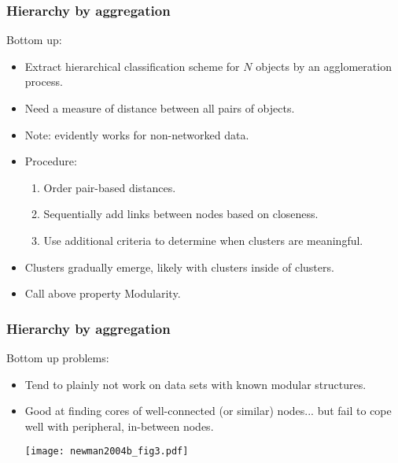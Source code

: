 \begin{frame}
  \frametitle{Hierarchy by aggregation}

  \begin{block}{Bottom up:}
    \begin{itemize}
    \item<1-> 
       Extract hierarchical
      classification scheme for $N$ objects by an agglomeration process.
    \item<2-> 
      Need a measure of distance between all pairs of objects.
    \item<3->
      Note: evidently works for non-networked data.
    \item<4->
      \alert{Procedure:}
      \begin{enumerate}
      \item<4-> 
        Order pair-based distances.
      \item<5-> 
        Sequentially add links between nodes based on closeness.
      \item<6-> 
        Use additional criteria to determine
        when clusters are meaningful.
      \end{enumerate}
    \item<7->
      Clusters gradually emerge, likely with clusters inside
      of clusters.
    \item<8-> 
      Call above property \alert{Modularity}.
    \end{itemize}
    
  \end{block}

\end{frame}

\begin{frame}
  \frametitle{Hierarchy by aggregation}

  \begin{block}{Bottom up problems:}
    \begin{itemize}
    \item<1->
      Tend to plainly not work on data sets
      with known modular structures.
    \item<2->
      Good at finding cores of well-connected
      (or similar) nodes...  but fail to
      cope well with peripheral, in-between nodes.
      \begin{overprint}
        \texttt{[image: newman2004b\_fig3.pdf]}
      \end{overprint}
    \end{itemize}
  \end{block}

\end{frame}

